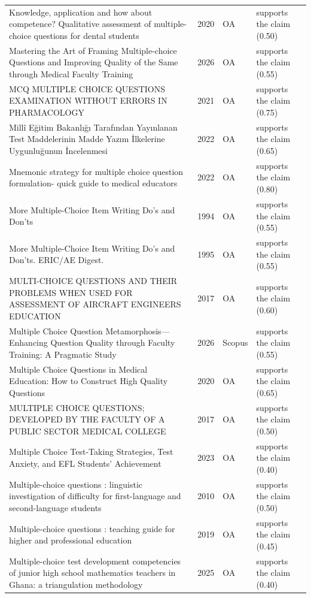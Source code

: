 \begin{longtable}{@{}%
  >{\raggedright\arraybackslash}p{}c%
  >{\raggedright\arraybackslash}p{}%
  >{\raggedright\arraybackslash}p{}@{}}
Knowledge, application and how about competence? Qualitative assessment of multiple-choice questions for dental students & 2020 & OA & supports the claim (0.50) \\
Mastering the Art of Framing Multiple-choice Questions and Improving Quality of the Same through Medical Faculty Training & 2026 & OA & supports the claim (0.55) \\
MCQ MULTIPLE CHOICE QUESTIONS EXAMINATION WITHOUT ERRORS IN PHARMACOLOGY & 2021 & OA & supports the claim (0.75) \\
Millî Eğitim Bakanlığı Tarafından Yayınlanan Test Maddelerinin Madde Yazım İlkelerine Uygunluğunun İncelenmesi & 2022 & OA & supports the claim (0.65) \\
Mnemonic strategy for multiple choice question formulation- quick guide to medical educators & 2022 & OA & supports the claim (0.80) \\
More Multiple-Choice Item Writing Do's and Don'ts & 1994 & OA & supports the claim (0.55) \\
More Multiple-Choice Item Writing Do's and Don'ts. ERIC/AE Digest. & 1995 & OA & supports the claim (0.55) \\
MULTI-CHOICE QUESTIONS AND THEIR PROBLEMS WHEN USED FOR ASSESSMENT OF AIRCRAFT ENGINEERS EDUCATION & 2017 & OA & supports the claim (0.60) \\
Multiple Choice Question Metamorphosis---Enhancing Question Quality through Faculty Training: A Pragmatic Study & 2026 & Scopus & supports the claim (0.55) \\
Multiple Choice Questions in Medical Education: How to Construct High Quality Questions & 2020 & OA & supports the claim (0.65) \\
MULTIPLE CHOICE QUESTIONS; DEVELOPED BY THE FACULTY OF A PUBLIC SECTOR MEDICAL COLLEGE & 2017 & OA & supports the claim (0.50) \\
Multiple Choice Test-Taking Strategies, Test Anxiety, and EFL Students' Achievement & 2023 & OA & supports the claim (0.40) \\
Multiple-choice questions : linguistic investigation of difficulty for first-language and second-language students & 2010 & OA & supports the claim (0.50) \\
Multiple-choice questions : teaching guide for higher and professional education & 2019 & OA & supports the claim (0.45) \\
Multiple-choice test development competencies of junior high school mathematics teachers in Ghana: a triangulation methodology & 2025 & OA & supports the claim (0.40) \\

\end{longtable}

